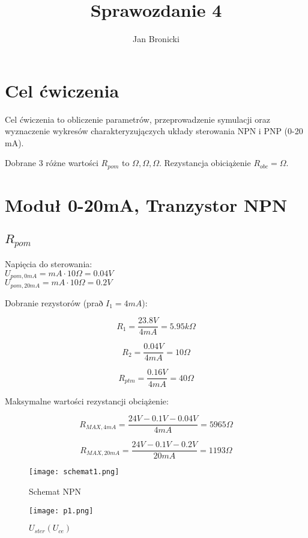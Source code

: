\documentclass{article}
\title{Sprawozdanie 4}
\author{Jan Bronicki}
\date{}
\begin{document}
\maketitle

\section{Cel ćwiczenia}

Cel ćwiczenia to obliczenie parametrów, przeprowadzenie symulacji oraz wyznaczenie wykresów charakteryzujączych układy sterowania NPN i PNP (0-20 mA).

Dobrane 3 różne wartości $R_{pom}$ to $\Omega, \Omega, \Omega$.
Rezystancja obiciążenie $R_{obc}=\Omega$.

\section{Moduł 0-20mA, Tranzystor NPN}

\subsection{$R_{pom}$}

Napięcia do sterowania:\\
$U_{pom, 0mA}=mA\cdot 10\Omega=0.04V$\\
$U_{pom, 20mA}=mA\cdot 10\Omega=0.2V$


Dobranie rezystorów (prað $I_{1}=4mA$):

$$
    R_{1}=\frac{23.8V}{4mA}=5.95k\Omega
$$

$$
    R_{2}=\frac{0.04V}{4mA}=10\Omega
$$


$$
    R_{ptm}=\frac{0.16V}{4mA}=40\Omega
$$


Maksymalne wartości rezystancji obciążenie:

$$
    R_{MAX, 4mA}=\frac{24V-0.1V-0.04V}{4mA}=5965\Omega
$$

$$
    R_{MAX, 20mA}=\frac{24V-0.1V-0.2V}{20mA}=1193\Omega
$$

\newpage

\begin{figure}[h!]
    \texttt{[image: schemat1.png]}
    \centering
    \caption{Schemat NPN}
\end{figure}

\begin{figure}[h!]
    \centering
    \texttt{[image: p1.png]}
    \caption{$U_{ster}(U_{ce})$}
\end{figure}
\end{document}
